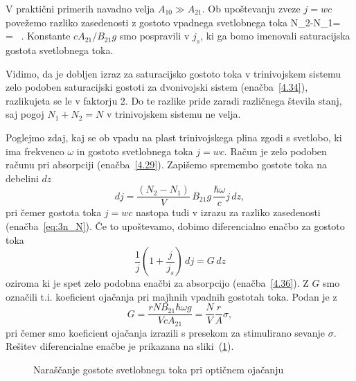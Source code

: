 V praktični primerih navadno velja $A_{10}\gg A_{21}$. Ob upoštevanju zveze $j=wc$ povežemo
razliko zasedenosti z gostoto vpadnega svetlobnega toka
\beq
N_{2}-N_{1}= \,  = 
 \, .
\label{eq:3n_N}
\eeq
Konstante $c A_{21}/B_{21}g$ smo pospravili v $j_s$, ki ga bomo imenovali 
saturacijska gostota svetlobnega toka. 
\begin{remark}
 Vidimo, da je dobljen izraz za saturacijsko gostoto toka v trinivojskem sistemu zelo 
 podoben saturacijski gostoti za dvonivojski sistem (enačba~\ref{4.34}), razlikujeta se le
v faktorju 2. Do te razlike pride zaradi različnega števila stanj, saj pogoj $N_{1}+N_{2}=N$
v trinivojskem sistemu ne velja. 
\end{remark}

Poglejmo zdaj, kaj se ob vpadu na plast trinivojskega plina zgodi s svetlobo, ki 
ima frekvenco $\omega$ in gostoto svetlobnega toka $j=wc$. Račun je zelo podoben računu pri absorpciji (enačba~\ref{4.29}). Zapišemo
spremembo gostote toka na debelini $dz$ 
\begin{equation}
dj=\frac{(N_{2}-N_{1})}{V}\, B_{21}g\, \frac{\hbar\omega}{c}j\, dz,
\label{eq:dj}
\end{equation}
pri čemer gostota toka $j = wc$ nastopa tudi v izrazu za razliko zasedenosti (enačba~\ref{eq:3n_N}). 
Če to upoštevamo, dobimo diferencialno enačbo za gostoto toka
\begin{equation}
\frac{1}{j}\left(1+\frac{j}{j_{s}}\right)\, dj=G\, dz
\label{4.43}
\end{equation}
oziroma
ki je spet zelo podobna enačbi za absorpcijo (enačba~\ref{4.36}).
Z $G$ smo označili t.i. koeficient ojačanja pri majhnih vpadnih gostotah
toka. Podan je z 
\begin{equation}
G=\frac{rNB_{21}\hbar\omega g}{VcA_{21}} = \frac{N}{V}\frac{r}{A}\sigma,
\label{4.44}
\end{equation}
pri čemer smo koeficient ojačanja izrazili s presekom za stimulirano 
sevanje $\sigma$. 
Rešitev diferencialne enačbe je prikazana na sliki~(\ref{fig:ojacanje}). 
\begin{figure}[h]
\centering
\def\svgwidth{90truemm} 

\caption{Naraščanje gostote svetlobnega toka pri optičnem ojačanju}
\label{fig:ojacanje}
\end{figure}

